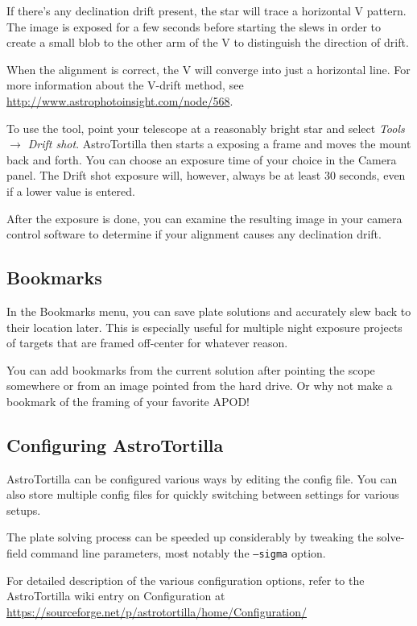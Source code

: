 \documentclass[english]{article}
\newcommand{\surl}[1]{{\small \url{#1}}}
\begin{document}
If there's any declination drift present, the star will trace a horizontal V
pattern. The image is exposed for a few seconds before starting the slews in
order to create a small blob to the other arm of the V to distinguish the
direction of drift.

When the alignment is correct, the V will converge into just a horizontal line.
For more information about the V-drift method, see
\surl{http://www.astrophotoinsight.com/node/568}.

To use the tool, point your telescope at a reasonably bright star and select
\emph{Tools $\rightarrow$ Drift shot}.  AstroTortilla then starts a exposing 
a frame and moves the mount back and forth. You can choose an exposure time of 
your choice in the Camera panel. The Drift shot exposure will, however, always 
be at least 30 seconds, even if a lower value is entered.

After the exposure is done, you can examine the resulting image in your camera 
control software to determine if your alignment causes any declination drift.

\subsection{Bookmarks}

In the Bookmarks menu, you can save plate solutions and accurately slew back to their location later. 
This is especially useful for multiple night exposure projects of targets that are framed off-center for whatever reason.

You can add bookmarks from the current solution after pointing the scope somewhere or from an image pointed from the hard drive. Or why not make a bookmark of the framing of your favorite APOD!

\subsection{Configuring AstroTortilla}

AstroTortilla can be configured various ways by editing the config file. You can also store multiple config files for quickly switching between
settings for various setups.

The plate solving process can be speeded up considerably by tweaking the solve-field command line parameters, most notably the \texttt{--sigma} option.

For detailed description of the various configuration options, refer to the AstroTortilla wiki entry on Configuration at
\surl{https://sourceforge.net/p/astrotortilla/home/Configuration/}
\end{document}
